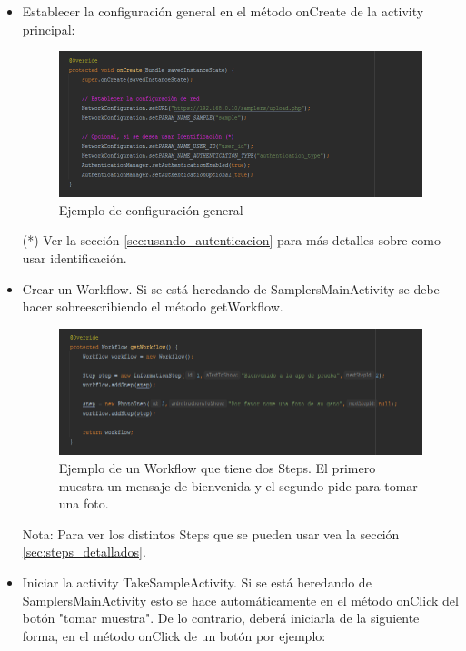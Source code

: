\begin{itemize}
	\item Establecer la configuración general en el método onCreate de la activity principal:
	
		
\begin{figure}[H]
  \centering
    \includegraphics[scale=0.6]{50-anexos/B-uso/configuracion_general.png} 
   \caption{Ejemplo de configuración general}
\end{figure}		
		
		
(*) Ver la sección \ref{sec:usando_autenticacion} para más detalles sobre como usar identificación.


	\item Crear un Workflow. Si se está heredando de SamplersMainActivity se debe hacer sobreescribiendo el método getWorkflow.
	
\begin{figure}[H]
  \centering
    \includegraphics[scale=0.6]{50-anexos/B-uso/get_workflow.png} 
   \caption{Ejemplo de un Workflow que tiene dos Steps. El primero muestra un mensaje de bienvenida y el segundo pide para tomar una foto.}
\end{figure}		
	

Nota: Para ver los distintos Steps que se pueden usar vea la sección \ref{sec:steps_detallados}.

	\item Iniciar la activity TakeSampleActivity. Si se está heredando de SamplersMainActivity esto se hace automáticamente en el método onClick del botón "tomar muestra". De lo contrario, deberá iniciarla de la siguiente forma, en el método onClick de un botón por ejemplo:


\end{itemize}
